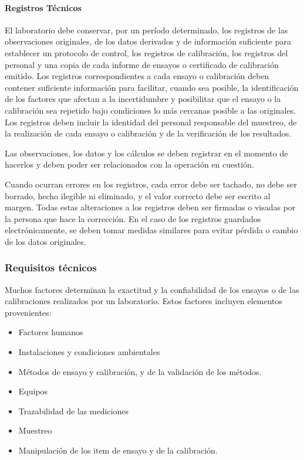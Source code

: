 \paragraph{Registros Técnicos}
El laboratorio debe conservar, por un período determinado, los registros de las observaciones
originales, de los datos derivados y de información suficiente para establecer un protocolo de control, los
registros de calibración, los registros del personal y una copia de cada informe de ensayos o certificado de
calibración emitido. Los registros correspondientes a cada ensayo o calibración deben contener suficiente
información para facilitar, cuando sea posible, la identificación de los factores que afectan a la incertidumbre y
posibilitar que el ensayo o la calibración sea repetido bajo condiciones lo más cercanas posible a las
originales. Los registros deben incluir la identidad del personal responsable del muestreo, de la realización de
cada ensayo o calibración y de la verificación de los resultados.

\par \noindent
Las observaciones, los datos y los cálculos se deben registrar en el momento de hacerlos y
deben poder ser relacionados con la operación en cuestión.

\par \noindent
Cuando ocurran errores en los registros, cada error debe ser tachado, no debe ser borrado,
hecho ilegible ni eliminado, y el valor correcto debe ser escrito al margen. Todas estas alteraciones a los
registros deben ser firmadas o visadas por la persona que hace la corrección. En el caso de los registros
guardados electrónicamente, se deben tomar medidas similares para evitar pérdida o cambio de los datos
originales.

\subsubsection{Requisitos técnicos}
Muchos factores determinan la exactitud y la confiabilidad de los ensayos o de las calibraciones
realizados por un laboratorio. Estos factores incluyen elementos provenientes:

\begin{itemize}
	\item Factores humanos
	
	\item Instalaciones y condiciones ambientales
	
	\item Métodos de ensayo y calibración, y de la validación de los métodos.
	
	\item Equipos
	
	\item Trazabilidad de las mediciones 
	
	\item Muestreo
	
	\item Manipulación de los item de ensayo y de la calibración.
\end{itemize}

